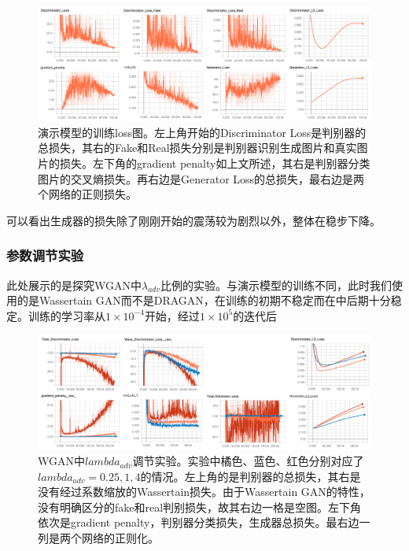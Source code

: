\documentclass[a4paper,12pt,UTF8]{ctexart}
\newcommand{\kai}{\CJKfamily{zhkai}}	%
\begin{document}
\begin{figure}[H]
  \centering
  \includegraphics[width=1\linewidth]{figs/good_model_dragan.png}
  \caption{\kai 演示模型的训练loss图。左上角开始的Discriminator Loss是判别器的总损失，其右的Fake和Real损失分别是判别器识别生成图片和真实图片的损失。左下角的gradient penalty如上文所述，其右是判别器分类图片的交叉熵损失。再右边是Generator Loss的总损失，最右边是两个网络的正则损失。}
  \label{fig:goodmodel_dragan}
\end{figure}

可以看出生成器的损失除了刚刚开始的震荡较为剧烈以外，整体在稳步下降。


\subsubsection{参数调节实验}

此处展示的是探究WGAN中$\lambda_{adv}$比例的实验。与演示模型的训练不同，此时我们使用的是Wassertain GAN而不是DRAGAN，在训练的初期不稳定而在中后期十分稳定。训练的学习率从$1 \times 10^{-4}$开始，经过$1 \times 10^{5}$的迭代后

\begin{figure}[H]
  \centering
  \includegraphics[width=1\linewidth]{figs/good_model_wgan.png}
  \caption{\kai WGAN中$lambda_{adv}$调节实验。实验中橘色、蓝色、红色分别对应了$lambda_{adv}=0.25, 1, 4$的情况。左上角的是判别器的总损失，其右是没有经过系数缩放的Wassertain损失。由于Wassertain GAN的特性，没有明确区分的fake和real判别损失，故其右边一格是空图。左下角依次是gradient penalty，判别器分类损失，生成器总损失。最右边一列是两个网络的正则化。}
  \label{fig:goodmodel_dragan}
\end{figure}
\end{document}
